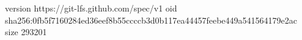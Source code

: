version https://git-lfs.github.com/spec/v1
oid sha256:0fb5f7160284ed36eef8b55ccccb3d0b117ea44457feebe449a541564179e2ac
size 293201
